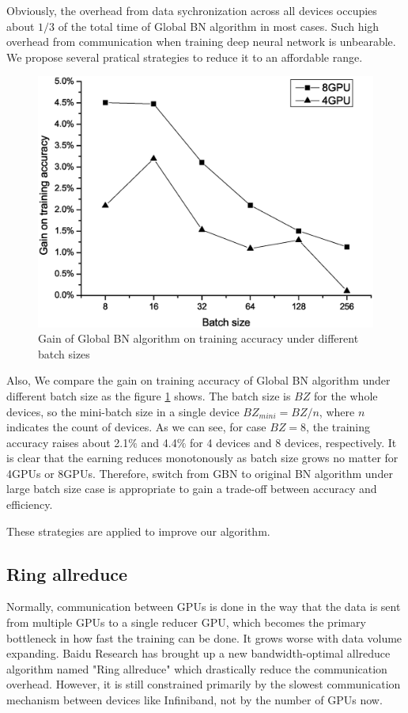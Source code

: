 Obviously, the overhead from data sychronization across all devices occupies about $1/3$ of the total time of Global BN algorithm in most cases. Such high overhead from communication when training deep neural network is unbearable. We propose several pratical strategies to reduce it to an affordable range.

\begin{figure}[!hbp]
    \centering
    \includegraphics[width=0.8\linewidth]{figure/accVsBz.eps}
    \caption{Gain of Global BN algorithm on training accuracy under different batch sizes}
    \label{fig:accVsBz}
    \end{figure}

Also, We compare the gain on training accuracy of Global BN algorithm under different batch size as the figure \ref{fig:accVsBz} shows. The batch size is $BZ$ for the whole devices, so the mini-batch size in a single device $BZ_{mini}=BZ/n$, where $n$ indicates the count of devices. 
As we can see, for case $BZ=8$, the training accuracy raises about 2.1$\%$ and 4.4$\%$ for 4 devices and 8 devices, respectively. It is clear that the earning reduces monotonously as batch size grows no matter for 4GPUs or 8GPUs. Therefore, switch from GBN to original BN algorithm under large batch size case is appropriate to gain a trade-off between accuracy and efficiency.



These strategies are applied to improve our algorithm.

\subsection{Ring allreduce}

Normally, communication between GPUs is done in the way that the data is sent from multiple GPUs to a single reducer GPU, which becomes the primary bottleneck in how fast the training can be done. It grows worse with data volume expanding. Baidu Research has brought up a new bandwidth-optimal allreduce algorithm named "Ring allreduce"\cite{} which drastically reduce the communication overhead. However, it is still constrained primarily by the slowest communication mechanism between devices like Infiniband, not by the number of GPUs now.

